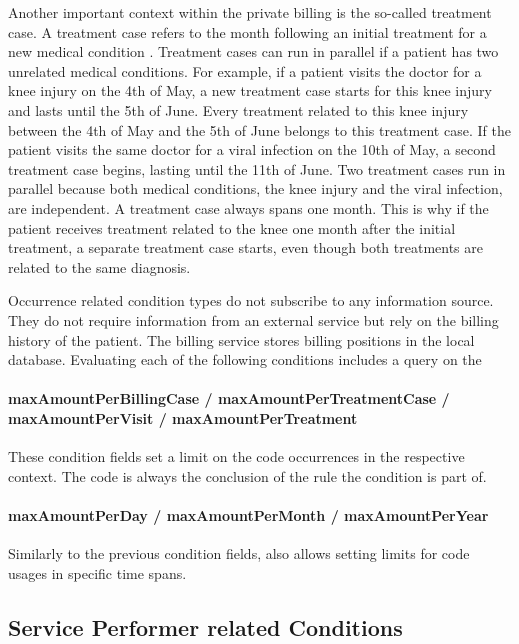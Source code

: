 Another important context within the private billing is the so-called treatment case.
A treatment case refers to the month following an initial treatment for a new medical condition \cite{bruck1998kommentar}.
Treatment cases can run in parallel if a patient has two unrelated medical conditions.
For example, if a patient visits the doctor for a knee injury on the 4th of May, a new treatment case starts for this knee injury and lasts until the 5th of June.
Every treatment related to this knee injury between the 4th of May and the 5th of June belongs to this treatment case.
If the patient visits the same doctor for a viral infection on the 10th of May, a second treatment case begins, lasting until the 11th of June.
Two treatment cases run in parallel because both medical conditions, the knee injury and the viral infection, are independent.
A treatment case always spans one month.
This is why if the patient receives treatment related to the knee one month after the initial treatment, a separate treatment case starts, even though both treatments are related to the same diagnosis.

Occurrence related condition types do not subscribe to any information source.
They do not require information from an external service but rely on the billing history of the patient.
The billing service stores billing positions in the local database.
Evaluating each of the following conditions includes a query on the

\paragraph{maxAmountPerBillingCase / maxAmountPerTreatmentCase / maxAmountPerVisit / maxAmountPerTreatment}
These condition fields set a limit on the code occurrences in the respective context.
The code is always the conclusion of the rule the condition is part of.

\paragraph{maxAmountPerDay / maxAmountPerMonth / maxAmountPerYear}
Similarly to the previous condition fields, \RL also allows setting limits for code usages in specific time spans.

\subsection{Service Performer related Conditions}\label{subsec:service-performer-related-conditions}

